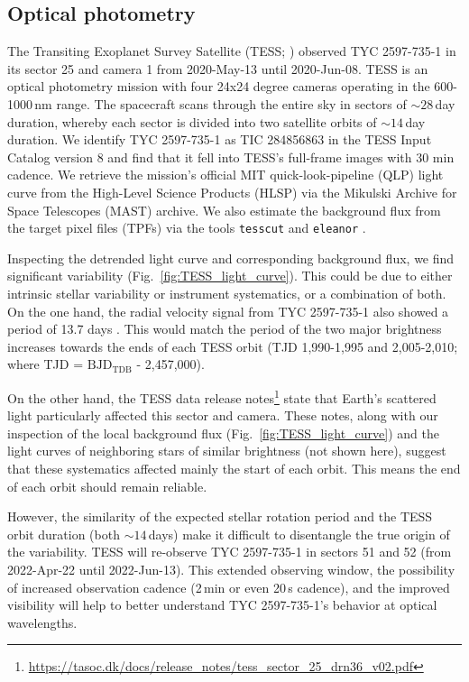 \documentclass[linenumbers]{aastex631}
\begin{document}
\subsection{Optical photometry}
\label{sec:TESS}
The Transiting Exoplanet Survey Satellite (TESS; \citealt{Ricker2015}) observed TYC 2597-735-1 in its sector 25 and camera 1 from 2020-May-13 until 2020-Jun-08.
TESS is an optical photometry mission with four 24x24 degree cameras operating in the 600-1000\,nm range. The spacecraft scans through the entire sky in sectors of $\sim28$\,day duration, whereby each sector is divided into two satellite orbits of $\sim14$\,day duration.
We identify TYC 2597-735-1 as TIC 284856863 in the TESS Input Catalog version 8 \citep{Stassun2019} and find that it fell into TESS's full-frame images with 30 min cadence.
We retrieve the mission's official MIT quick-look-pipeline (QLP) light curve from the High-Level Science Products (HLSP) via the Mikulski Archive for Space Telescopes (MAST) archive.
We also estimate the background flux from the target pixel files (TPFs) via the tools \texttt{tesscut} \citep{Brasseur2019} and \texttt{eleanor} \citep{Feinstein2019}.

Inspecting the detrended light curve and corresponding background flux, we find significant variability (Fig.~\ref{fig:TESS_light_curve}).
This could be due to either intrinsic stellar variability or instrument systematics, or a combination of both.
On the one hand, the radial velocity signal from TYC 2597-735-1 also showed a period of 13.7 days \citep{2020Natur.587..387H}. This would match the period of the two major brightness increases towards the ends of each TESS orbit (TJD 1,990-1,995 and 2,005-2,010; where TJD = $\mathrm{BJD_{TDB}}$ - 2,457,000).

On the other hand, the TESS data release notes\footnote{\url{https://tasoc.dk/docs/release_notes/tess_sector_25_drn36_v02.pdf}} state that Earth's scattered light particularly affected this sector and camera. These notes, along with our inspection of the local background flux (Fig.~\ref{fig:TESS_light_curve}) and the light curves of neighboring stars of similar brightness (not shown here), suggest that these systematics affected mainly the start of each orbit. This means the end of each orbit should remain reliable.

However, the similarity of the expected stellar rotation period and the TESS orbit duration (both $\sim14$\,days) make it difficult to disentangle the true origin of the variability. TESS will re-observe TYC 2597-735-1 in sectors 51 and 52 (from 2022-Apr-22 until 2022-Jun-13). This extended observing window, the possibility of increased observation cadence (2\,min or even 20\,s cadence), and the improved visibility will help to better understand TYC 2597-735-1's behavior at optical wavelengths.
\end{document}
